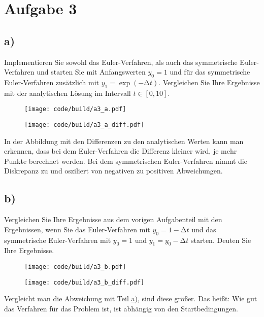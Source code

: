 \section{Aufgabe 3} \label{sec:A3}
\subsection*{a)} \label{sec:A3:a}
\begin{tcolorbox}
  Implementieren Sie sowohl das Euler-Verfahren, als auch das symmetrische Euler-Verfahren
  und starten Sie mit Anfangswerten $y_0 = 1$ und für das symmetrische Euler-Verfahren zusätzlich mit $y_1 = \exp(−∆t)$.
  Vergleichen Sie Ihre Ergebnisse mit der analytischen Lösung im Intervall $t ∈ [0, 10]$.
\end{tcolorbox}

\begin{figure}[H]
  \centering
  \texttt{[image: code/build/a3\_a.pdf]}
\end{figure}
\begin{figure}[H]
  \centering
  \texttt{[image: code/build/a3\_a\_diff.pdf]}
\end{figure}
In der Abbildung mit den Differenzen zu den analytischen Werten
kann man erkennen, dass bei dem Euler-Verfahren die Differenz kleiner wird,
je mehr Punkte berechnet werden.
Bei dem symmetrischen Euler-Verfahren nimmt die Diskrepanz zu und osziliert
von negativen zu positiven Abweichungen.


\subsection*{b)} \label{sec:A3:b}
\begin{tcolorbox}
  Vergleichen Sie Ihre Ergebnisse aus dem vorigen Aufgabenteil mit den Ergebnissen,
  wenn Sie das Euler-Verfahren mit $y_0 = 1 − ∆t$
  und das symmetrische Euler-Verfahren mit $y_0 = 1$ und $y_1 = y_0 − ∆t$ starten.
  Deuten Sie Ihre Ergebnisse.
\end{tcolorbox}

\begin{figure}[H]
  \centering
  \texttt{[image: code/build/a3\_b.pdf]}
\end{figure}
\begin{figure}[H]
  \centering
  \texttt{[image: code/build/a3\_b\_diff.pdf]}
\end{figure}
Vergleicht man die Abweichung mit Teil \hyperref[sec:A3:a]{a)}, sind diese größer.
Das heißt: Wie gut das Verfahren für das Problem ist, ist abhängig von den Startbedingungen.
